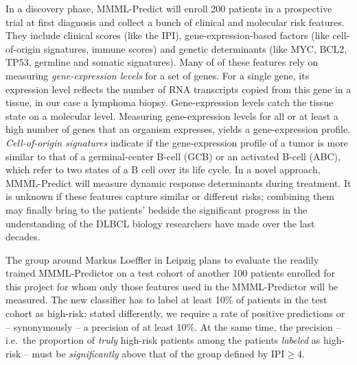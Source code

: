 In a discovery phase, MMML-Predict will enroll \num{200} patients in a prospective trial at first 
diagnosis and 
collect a bunch of clinical and molecular risk features.
They include clinical scores (like the IPI), gene-expression-based factors (like cell-of-origin 
signatures, immune scores) and genetic determinants (like MYC, BCL2, TP53, germline and somatic 
signatures). Many of of these features rely on measuring \textit{gene-expression levels} for a set 
of genes. 
For a single gene, its expression level reflects the number of RNA transcripts copied from 
this gene in a tissue, in our case a lymphoma biopsy. Gene-expression levels catch the tissue
state on a molecular level. Measuring gene-expression levels for all 
or at least a high number of genes that an organism expresses, yields a gene-expression profile. 
\textit{Cell-of-origin signatures} indicate if the gene-expression profile 
of a tumor is more similar to that of a germinal-center B-cell (GCB) or an activated B-cell (ABC), 
which refer to two states of a B cell over its life cycle.
In a novel approach, MMML-Predict will measure dynamic response determinants during treatment. It is 
unknown if these features capture similar or different 
risks; combining them may finally bring to the patients' bedside the significant progress in the 
understanding of the DLBCL biology researchers have made over the last decades.

The group around Markus Loeffler in Leipzig plans to evaluate the readily trained MMML-Predictor on 
a test cohort of another \num{100} patients enrolled for this project for whom only those features 
used in the MMML-Predictor will be measured. The new classifier has to label at least \num{10}\% of 
patients in the test cohort as high-risk; stated differently, we require a rate of positive 
predictions or -- synonymously -- a precision of at least \num{10}\%. At the same time, the 
precision -- i.e.\ the proportion of \textit{truly} high-risk patients among the patients 
\textit{labeled} as high-risk -- must be \textit{significantly} above that of the group defined by
$\text{IPI} \geq 4$. 

